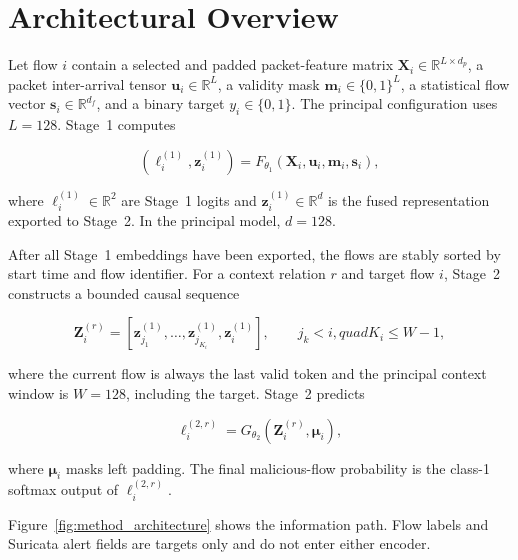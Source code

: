 \documentclass[11pt,fleqn]{report}
\begin{document}
\section{Architectural Overview}
\label{subsec:method_architecture}

Let flow $i$ contain a selected and padded packet-feature matrix
$\mathbf{X}_i\in\mathbb{R}^{L\times d_p}$, a packet inter-arrival tensor
$\mathbf{u}_i\in\mathbb{R}^{L}$, a validity mask
$\mathbf{m}_i\in\{0,1\}^{L}$, a statistical flow vector
$\mathbf{s}_i\in\mathbb{R}^{d_f}$, and a binary target
$y_i\in\{0,1\}$. The principal configuration uses $L=128$. Stage~1 computes

\begin{equation}
    \left(\boldsymbol{\ell}^{(1)}_i,\mathbf{z}^{(1)}_i\right)
    =F_{\theta_1}
    \left(
        \mathbf{X}_i,\mathbf{u}_i,\mathbf{m}_i,\mathbf{s}_i
    \right),
    \label{eq:method_stage1_mapping}
\end{equation}

where $\boldsymbol{\ell}^{(1)}_i\in\mathbb{R}^{2}$ are Stage~1 logits and
$\mathbf{z}^{(1)}_i\in\mathbb{R}^{d}$ is the fused representation exported to
Stage~2. In the principal model, $d=128$.

After all Stage~1 embeddings have been exported, the flows are stably sorted by
start time and flow identifier. For a context relation $r$ and target flow $i$,
Stage~2 constructs a bounded causal sequence

\begin{equation}
    \mathbf{Z}^{(r)}_i=
    \left[
        \mathbf{z}^{(1)}_{j_1},\ldots,
        \mathbf{z}^{(1)}_{j_{K_i}},
        \mathbf{z}^{(1)}_i
    \right],
    \qquad j_k<i,quad K_i\leq W-1,
    \label{eq:method_stage2_input}
\end{equation}

where the current flow is always the last valid token and the principal context
window is $W=128$, including the target. Stage~2 predicts

\begin{equation}
    \boldsymbol{\ell}^{(2,r)}_i
    =G_{\theta_2}
    \left(\mathbf{Z}^{(r)}_i,\boldsymbol{\mu}_i\right),
    \label{eq:method_stage2_mapping}
\end{equation}

where $\boldsymbol{\mu}_i$ masks left padding. The final malicious-flow
probability is the class-1 softmax output of
$\boldsymbol{\ell}^{(2,r)}_i$.

Figure~\ref{fig:method_architecture} shows the information path. Flow labels
and Suricata alert fields are targets only and do not enter either encoder.
\end{document}
